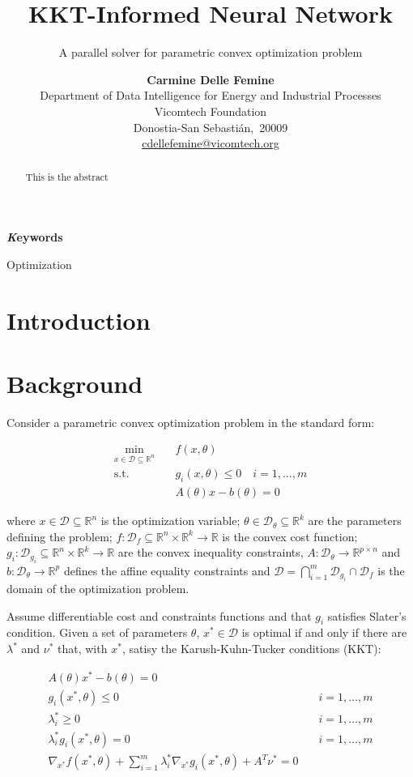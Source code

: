 \documentclass[
]{article}
\title{KKT-Informed Neural Network}
\subtitle{A parallel solver for parametric convex optimization problem}
\author{\textbf{Carmine Delle Femine}\\Department of Data Intelligence
for Energy and Industrial Processes\\Vicomtech Foundation\\Donostia-San
Sebastián,\ 20009\\\href{mailto:cdellefemine@vicomtech.org}{cdellefemine@vicomtech.org}}
\date{}
\begin{document}
\maketitle
\begin{abstract}
This is the abstract
\end{abstract}
{\bfseries \emph Keywords}
\def\sep{\textbullet\ }

Optimization


\section{Introduction}\label{introduction}

\section{Background}\label{background}

Consider a parametric convex optimization problem in the standard form:

\[
\begin{aligned}
\min_{x \in \mathcal{D} \subseteq\mathbb{R}^n} \quad &f(x, {\theta})\\
\textrm{s.t.} \quad & g_i(x, \theta) \leq 0 \quad i = 1, \dots, m \\
& A(\theta) x - b(\theta) = 0
\end{aligned}
\]

where \(x \in \mathcal{D} \subseteq\mathbb{R}^n\) is the optimization
variable; \(\theta \in \mathcal{D}_\theta \subseteq \mathbb{R}^k\) are
the parameters defining the problem;
\(f: \mathcal{D}_f \subseteq\mathbb{R}^n \times \mathbb{R}^k \to \mathbb{R}\)
is the convex cost function;
\(g_i: \mathcal{D}_{g_i} \subseteq\mathbb{R}^n \times \mathbb{R}^k \to \mathbb{R}\)
are the convex inequality constraints,
\(A: \mathcal{D}_\theta \to \mathbb{R}^{p \times n}\) and
\(b: \mathcal{D}_\theta \to \mathbb{R}^{p}\) defines the affine equality
constraints and
\(\mathcal{D} = \bigcap_{i=1}^{m} \mathcal{D}_{g_i} \cap \mathcal{D}_{f}\)
is the domain of the optimization problem.

Assume differentiable cost and constraints functions and that \(g_i\)
satisfies Slater's condition. Given a set of parameters \(\theta\),
\(x^* \in \mathcal{D}\) is optimal if and only if there are
\(\lambda^*\) and \(\nu^*\) that, with \(x^*\), satisy the
Karush-Kuhn-Tucker conditions (KKT):

\begin{align}
    A(\theta) x^* - b(\theta) = 0&\\
    g_i(x^*, \theta) \leq 0& \quad i=1,\dots, m\\
    \lambda_i^* \geq 0& \quad i=1,\dots, m\\
    \lambda_i^* g_i(x^*, \theta) = 0& \quad i=1,\dots, m\\
    \nabla_{x^*} f(x^*, \theta) + \sum\nolimits_{i=1}^m \lambda^*_i\nabla_{x^*} g_i(x^*, \theta) + A^T\nu^* = 0 &
\end{align}
\end{document}
